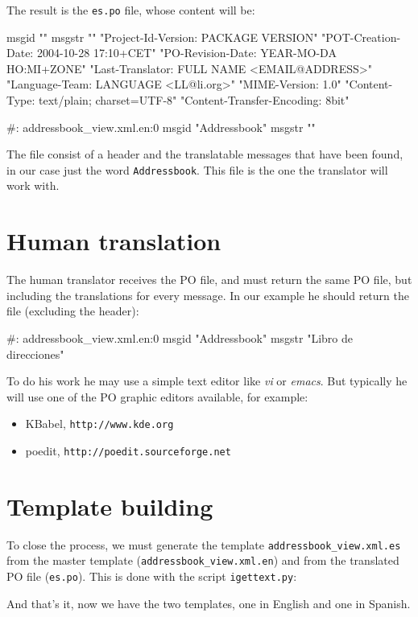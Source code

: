 The result is the {\tt es.po} file, whose content will be:

\begin{code}
    msgid ""
    msgstr ""
    "Project-Id-Version: PACKAGE VERSION\n"
    "POT-Creation-Date: 2004-10-28 17:10+CET\n"
    "PO-Revision-Date: YEAR-MO-DA HO:MI+ZONE\n"
    "Last-Translator: FULL NAME <EMAIL@ADDRESS>\n"
    "Language-Team: LANGUAGE <LL@li.org>\n"
    "MIME-Version: 1.0\n"
    "Content-Type: text/plain; charset=UTF-8\n"
    "Content-Transfer-Encoding: 8bit\n"

    #: addressbook_view.xml.en:0
    msgid "Addressbook"
    msgstr ""
\end{code}

The file consist of a header and the translatable messages that have been
found, in our case just the word {\tt Addressbook}. This file is the one
the translator will work with.


\section{Human translation}

The human translator receives the PO file, and must return the same PO
file, but including the translations for every message. In our example
he should return the file (excluding the header):

\begin{code}
    #: addressbook_view.xml.en:0
    msgid "Addressbook"
    msgstr "Libro de direcciones"
\end{code}

To do his work he may use a simple text editor like {\em vi} or {\em emacs}.
But typically he will use one of the PO graphic editors available, for
example:

\begin{itemize}
  \item KBabel, {\tt http://www.kde.org}
  \item poedit, {\tt http://poedit.sourceforge.net}
\end{itemize}


\section{Template building}

To close the process, we must generate the template
{\tt addressbook\_view.xml.es} from the master template
({\tt addressbook\_view.xml.en}) and from the translated PO file ({\tt es.po}).
This is done with the script {\tt igettext.py}:


And that's it, now we have the two templates, one in English and one in
Spanish.



